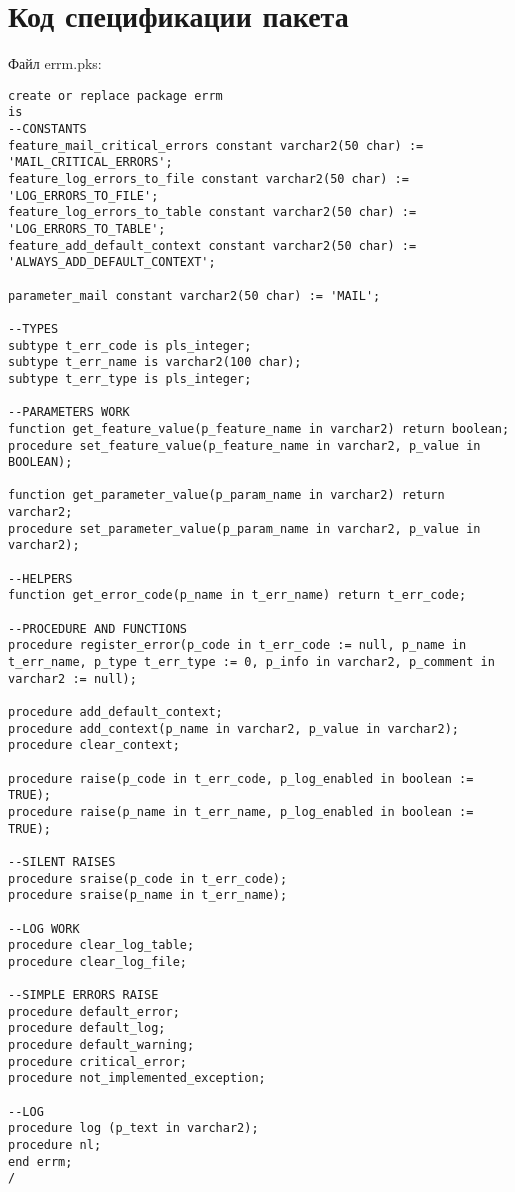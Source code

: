 \section{Код спецификации пакета}\label{app-2}
Файл errm.pks:

\begin{verbatim}
create or replace package errm
is
--CONSTANTS
feature_mail_critical_errors constant varchar2(50 char) := 'MAIL_CRITICAL_ERRORS';
feature_log_errors_to_file constant varchar2(50 char) := 'LOG_ERRORS_TO_FILE';
feature_log_errors_to_table constant varchar2(50 char) := 'LOG_ERRORS_TO_TABLE';
feature_add_default_context constant varchar2(50 char) := 'ALWAYS_ADD_DEFAULT_CONTEXT';

parameter_mail constant varchar2(50 char) := 'MAIL';

--TYPES
subtype t_err_code is pls_integer;
subtype t_err_name is varchar2(100 char);
subtype t_err_type is pls_integer;

--PARAMETERS WORK
function get_feature_value(p_feature_name in varchar2) return boolean;
procedure set_feature_value(p_feature_name in varchar2, p_value in BOOLEAN);

function get_parameter_value(p_param_name in varchar2) return varchar2;
procedure set_parameter_value(p_param_name in varchar2, p_value in varchar2);

--HELPERS
function get_error_code(p_name in t_err_name) return t_err_code;

--PROCEDURE AND FUNCTIONS
procedure register_error(p_code in t_err_code := null, p_name in t_err_name, p_type t_err_type := 0, p_info in varchar2, p_comment in varchar2 := null);

procedure add_default_context;
procedure add_context(p_name in varchar2, p_value in varchar2);
procedure clear_context;

procedure raise(p_code in t_err_code, p_log_enabled in boolean := TRUE);
procedure raise(p_name in t_err_name, p_log_enabled in boolean := TRUE);

--SILENT RAISES
procedure sraise(p_code in t_err_code);
procedure sraise(p_name in t_err_name);

--LOG WORK
procedure clear_log_table;
procedure clear_log_file;

--SIMPLE ERRORS RAISE
procedure default_error;
procedure default_log;
procedure default_warning;
procedure critical_error;
procedure not_implemented_exception;

--LOG
procedure log (p_text in varchar2);
procedure nl;
end errm;
/
\end{verbatim}


